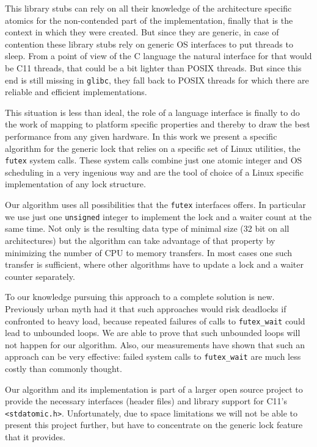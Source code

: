 \documentclass{sig-alternate-05-2015}
\begin{document}
This library stubs can rely on all their knowledge of the
architecture specific atomics for the non-contended part of the
implementation, finally that is the context in which they were
created. But since they are generic, in case of contention these
library stubs rely on generic OS interfaces to put threads to
sleep. From a point of view of the C language the natural interface
for that would be C11 threads, that could be a bit lighter than
POSIX threads. But since this end is still missing in \texttt{glibc}, they
fall back to POSIX threads for which there are reliable and
efficient implementations.

This situation is less than ideal, the role of a language interface
is finally to do the work of mapping to platform specific properties
and thereby to draw the best performance from any given hardware. In
this work we present a specific algorithm for the generic lock that
relies on a specific set of Linux utilities, the \texttt{futex} system
calls. These system calls combine just one atomic integer and OS
scheduling in a very ingenious way and are the tool of choice of a
Linux specific implementation of any lock structure.

Our algorithm uses all possibilities that the \texttt{futex} interfaces
offers. In particular we use just one \texttt{unsigned} integer to
implement the lock and a waiter count at the same time. Not only is
the resulting data type of minimal size (32 bit on all
architectures) but the algorithm can take advantage of that property
by minimizing the number of CPU to memory transfers. In most cases
one such transfer is sufficient, where other algorithms have to
update a lock and a waiter counter separately.

To our knowledge pursuing this approach to a complete solution is
new. Previously urban myth had it that such approaches would risk
deadlocks if confronted to heavy load, because repeated failures of
calls to \texttt{futex\_wait} could lead to unbounded loops. We are able to
prove that such unbounded loops will not happen for our algorithm.
Also, our measurements have shown that such an approach can be very
effective: failed system calls to \texttt{futex\_wait} are much less costly
than commonly thought.

Our algorithm and its implementation is part of a larger open
source project to provide the necessary interfaces (header files)
and library support for C11's \texttt{<stdatomic.h>}. Unfortunately, due to
space limitations we will not be able to present this project
further, but have to concentrate on the generic lock feature that it
provides.
\end{document}
